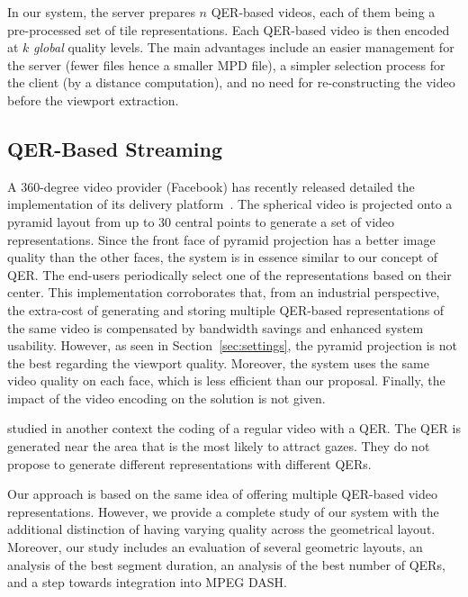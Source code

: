 In our system, the server
prepares $n$ \ac{QER}-based videos, each of them being a
pre-processed set of tile representations. Each \ac{QER}-based video is then
encoded at $k$ \emph{global} quality levels.
The main advantages include
an easier management for the server (fewer files hence a smaller
\ac{MPD} file), a simpler selection process for the client (by a
distance computation), and no need for re-constructing the video before
the viewport extraction.

\subsection{QER-Based Streaming}

A $360$-degree video provider (Facebook) has recently
released detailed the implementation of its delivery
platform~\cite{facebook}.
The spherical video is projected onto a pyramid layout from up to $30$ central
points to generate a set of video representations.
Since the
front face of pyramid projection has a better image quality than the other faces, the
system is in essence similar to our concept of \ac{QER}. The end-users
periodically select one of the representations
based on their \FoV{} center. This implementation
corroborates that, from an industrial perspective, the extra-cost of
generating and storing multiple \ac{QER}-based representations of the
same video is compensated by bandwidth savings and
enhanced system usability.
However, as seen in Section~\ref{sec:settings}, the pyramid projection is not
the best regarding the viewport quality. Moreover, the system
uses the same video quality on each face, which is less
efficient than our proposal. Finally, the impact of the video encoding on the solution
is not given.

\citet{lee2011efficient} studied in another context the coding of a regular
video with a \ac{QER}. The \ac{QER} is generated near the area that is the most likely
to attract gazes. They do not propose to generate different representations with different
\acp{QER}.

Our approach is based on the same
idea of offering multiple \ac{QER}-based video representations.
However, we provide a complete study of our system with the additional
distinction of having varying quality across the geometrical layout. Moreover,
our study includes an evaluation of several
geometric layouts, an analysis of the best segment duration, an
analysis of the best number of \acp{QER},
and a step towards integration into MPEG \ac{DASH}.
